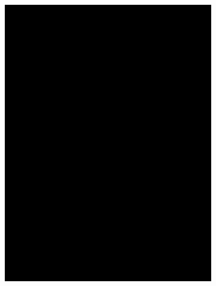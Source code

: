 \begin{figure}
\begin{center}
\begin{subfigure}[b]{0.3\textwidth}
			\includegraphics[width=\textwidth]{./figures/2d_grid_test.png}
		\end{subfigure}
		\begin{subfigure}[b]{0.3\textwidth}

\end{subfigure}
\end{center}
\end{figure}
